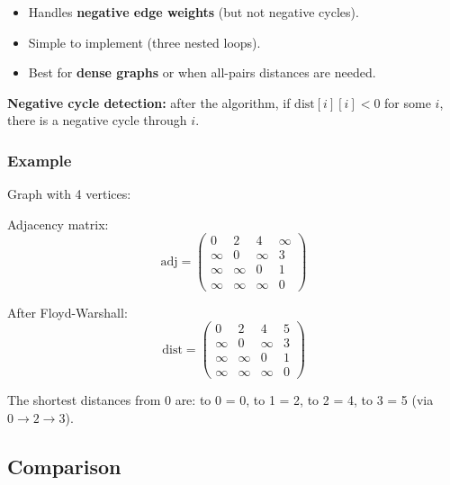 \documentclass[11pt,a4paper]{article}
\begin{document}
\begin{itemize}
    \item Handles \textbf{negative edge weights} (but not negative cycles).
    \item Simple to implement (three nested loops).
    \item Best for \textbf{dense graphs} or when all-pairs distances are needed.
\end{itemize}

\textbf{Negative cycle detection:} after the algorithm, if $\text{dist}[i][i] < 0$ for some $i$, there is a negative cycle through $i$.

\subsubsection{Example}

Graph with 4 vertices:

\begin{center}
\end{center}

Adjacency matrix:
\[
\text{adj} =
\begin{pmatrix}
0 & 2 & 4 & \infty \\
\infty & 0 & \infty & 3 \\
\infty & \infty & 0 & 1 \\
\infty & \infty & \infty & 0
\end{pmatrix}
\]

After Floyd-Warshall:
\[
\text{dist} =
\begin{pmatrix}
0 & 2 & 4 & 5 \\
\infty & 0 & \infty & 3 \\
\infty & \infty & 0 & 1 \\
\infty & \infty & \infty & 0
\end{pmatrix}
\]

The shortest distances from 0 are: to 0 = 0, to 1 = 2, to 2 = 4, to 3 = 5 (via $0 \to 2 \to 3$).

\subsection{Comparison}
\end{document}
